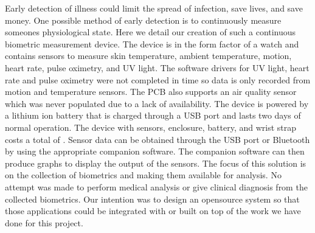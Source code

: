 Early detection of illness could limit the spread of infection, save lives, and
save money.  One possible method of early detection is to continuously measure
someones physiological state.  Here we detail our creation of such a continuous
biometric measurement device.  The device is in the form factor of a watch and
contains sensors to measure skin temperature, ambient temperature, motion, 
heart rate, pulse oximetry, and UV light. The software drivers for UV light,
heart rate and pulse oximetry were not completed in time so data is only
recorded from motion and temperature sensors. The PCB also supports an air
quality sensor which was never populated due to a lack of availability.
The device is powered by a lithium ion battery that is charged
through a USB port and lasts two days of normal operation.  
The device with sensors, enclosure, battery, and wrist strap costs a total of
\costofboard.  Sensor data can be
obtained through the USB port or Bluetooth by using the appropriate companion
software.  The companion software can then produce graphs to display the output
of the sensors.  The focus of this solution is on the collection of biometrics
and making them available for analysis.  No attempt was made to perform medical
analysis or give clinical diagnosis from the collected biometrics.  Our
intention was to design an opensource system so that those applications could be
integrated with or built on top of the work we have done for this project.
